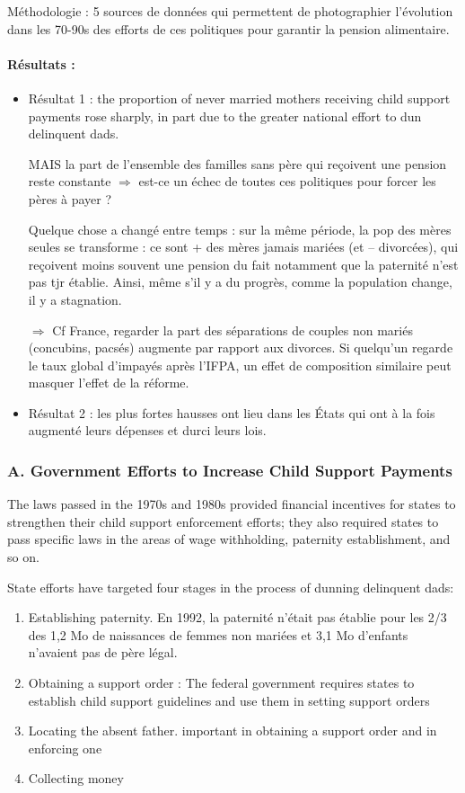 \documentclass{article}
\begin{document}
\medskip
\noindent Méthodologie : 5 sources de données qui permettent de photographier l'évolution dans les 70-90s des efforts de ces politiques pour garantir la pension alimentaire.
 
\paragraph{Résultats :}
\begin{itemize}
    \item Résultat 1 : the proportion of never married mothers receiving child support payments rose sharply, in part due to the greater national effort to dun delinquent dads.
 
    MAIS la part de l'ensemble des familles sans père qui reçoivent une pension reste constante $\Rightarrow$ est-ce un échec de toutes ces politiques pour forcer les pères à payer ?
 
    Quelque chose a changé entre temps : sur la même période, la pop des mères seules se transforme : ce sont + des mères jamais mariées (et -- divorcées), qui reçoivent moins souvent une pension du fait notamment que la paternité n'est pas tjr établie. Ainsi, même s'il y a du progrès, comme la population change, il y a stagnation.
 
    $\Rightarrow$ Cf France, regarder la part des séparations de couples non mariés (concubins, pacsés) augmente par rapport aux divorces. Si quelqu'un regarde le taux global d'impayés après l'IFPA, un effet de composition similaire peut masquer l'effet de la réforme.
 
    \item Résultat 2 : les plus fortes hausses ont lieu dans les États qui ont à la fois augmenté leurs dépenses et durci leurs lois.
\end{itemize}
 
 
\subsubsection*{A. Government Efforts to Increase Child Support Payments}
 
The laws passed in the 1970s and 1980s provided financial incentives for states to strengthen their child support enforcement efforts; they also required states to pass specific laws in the areas of wage withholding, paternity establishment, and so on.
 
\medskip
\noindent State efforts have targeted four stages in the process of dunning delinquent dads:
\begin{enumerate}
    \item Establishing paternity. En 1992, la paternité n'était pas établie pour les 2/3 des 1,2 Mo de naissances de femmes non mariées et 3,1 Mo d'enfants n'avaient pas de père légal.
    \item Obtaining a support order : The federal government requires states to establish child support guidelines and use them in setting support orders
    \item Locating the absent father. important in obtaining a support order and in enforcing one
    \item Collecting money
\end{enumerate}
 
\end{document}
